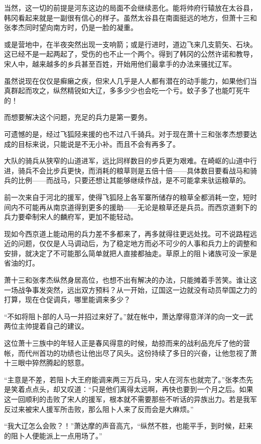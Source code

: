 当然，这一切的前提是河东这边的局面不会继续恶化。能将帅府行辕放在太谷县，韩冈看起来就是一副很有信心的样子。虽然太谷县在南面挺远的地方，但萧十三和张孝杰同时望向南方时，仍是一脸的凝重。

或是营地中，在半夜突然出现一支响箭；或是行进时，道边飞来几支箭矢、石块。这已经不是一起两起了，受伤的也不止一个两个。得到了韩冈的公然许诺和教导，宋人中，越来越多的乡兵甚至百姓，开始用他们最拿手的办法来骚扰辽军。

虽然说现在仅仅是癣癞之疾，但宋人几乎是人人都有潜在的动手能力，如果他们当真群起而攻之，纵然精锐如大辽，多多少少也会吃一个亏。蚊子多了也能叮死牛的！

而想要解决这个问题，充足的兵力是第一要务。

可遗憾的是，经过飞狐陉来援的也不过八千骑兵。对于现在萧十三和张孝杰想要达成的目标来说，只能说是不无小补。而且不会有再多了。

大队的骑兵从狭窄的山道进军，远比同样数目的步兵更为艰难。在崎岖的山道中行进，骑兵不会比步兵更快，而消耗的粮草则是五倍十倍——具体数目要看战马和骑兵的比例——而战马，只要还想让其能够继续作战，是不可能拿来驮运粮草的。

前一次来自于河北的援军，使得飞狐陉上各军寨所储存的粮草全都消耗一空，短时间内不可能再从南京道得到更多的援助——无论是粮草还是兵员。而西京道剩下的兵力要牵制宋人的麟府军，更加不能轻动。

现如今西京道上能动用的兵力差不多都来了，再多就得往更远处找。可不说路程远近的问题，仅仅是人马调动后，为了稳定地方而必不可少的人事和兵力上的调整和安排，就决定了不可能那么简单就把人直接都抽走。草原上的阻卜诸族可没一家是省油的灯。

萧十三和张孝杰纵然身居高位，也想不出有解决的办法，只能摊着手苦笑。谁让这一场战争事发突然，远出双方预料？从一开始，辽国这一边就没有动员举国之力的打算，现在仓促调兵，哪里能调来多少？

“不如将阻卜部的人马一并招过来好了。”就在帐中，萧达摩得意洋洋的向一文一武两位主帅提着自己的建议。

这位萧十三族中的年轻人正是春风得意的时候，劫掠而来的战利品充斥了他的营帐，而代州首功的功绩也让他出尽了风头。这份持续了多日的兴奋，让他忽视了萧十三眼中猝然腾起的怒意。

“主意是不差，若阻卜大王府能调来两三万兵马，宋人在河东也就完了。”张孝杰先是笑着点点头，却又叹道：“只是他们离得太远啊，再快也要到一个月之后。如果这一回顺利的击败了宋人的援军，根本就不需要那些不听话的异族出力。若是我军反过来被宋人援军所击败，那么阻卜人来了反而会是大麻烦。”

“我大辽怎么会败？！”萧达摩的声音高亢，“纵然不胜，也能平手，到时候，赶来的阻卜人便能派上一点用场了。”

